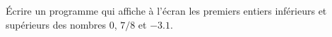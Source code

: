 
\begin{exercice}\label{exoPremiere-0036}

    Écrire un programme qui affiche à l'écran les premiers entiers inférieurs et supérieurs des nombres \( 0\), \( 7/8\) et \( -3.1\).

\end{exercice}
